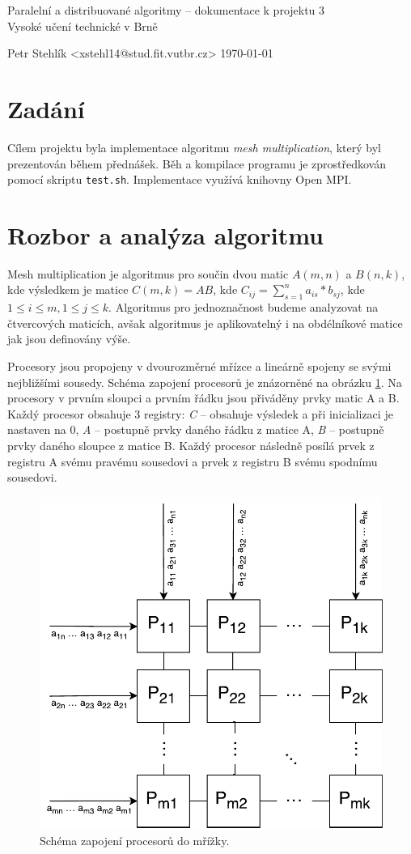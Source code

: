 \documentclass[11pt,a4paper]{article}
\begin{document}
\begin{center}
	\LARGE{Paralelní a distribuované algoritmy -- dokumentace k projektu 3}\\
	\large{Vysoké učení technické v Brně}
	\vspace{0.2cm}

	Petr Stehlík <xstehl14@stud.fit.vutbr.cz>     \today

\end{center}

\section{Zadání}

Cílem projektu byla implementace algoritmu \textit{mesh multiplication}, který byl prezentován během přednášek. Běh a kompilace programu je zprostředkován pomocí skriptu \texttt{test.sh}. Implementace využívá knihovny Open MPI.

\section{Rozbor a analýza algoritmu}

Mesh multiplication je algoritmus pro součin dvou matic $A(m,n)$ a $B(n,k)$, kde výsledkem je matice $C (m,k) = AB$, kde $C_{ij} = \sum\limits_{s=1}^n a_{is} * b_{sj}$, kde $1 \leq i \leq m, 1 \leq j \leq k$. Algoritmus pro jednoznačnost budeme analyzovat na čtvercových maticích, avšak algoritmus je aplikovatelný i na obdélníkové matice jak jsou definovány výše.

Procesory jsou propojeny v dvourozměrné mřízce a lineárně spojeny se svými nejbližšími sousedy. Schéma zapojení procesorů je znázorněné na obrázku \ref{schema}. Na procesory v prvním sloupci a prvním řádku jsou přiváděny prvky matic A a B. Každý procesor obsahuje 3 registry: \textit{C} -- obsahuje výsledek a při inicializaci je nastaven na $0$, \textit{A} -- postupně prvky daného řádku z matice A, \textit{B} -- postupně prvky daného sloupce z matice B. Každý procesor následně posílá prvek z registru A svému pravému sousedovi a prvek z registru B svému spodnímu sousedovi.

\begin{figure}[h]
    \includegraphics[width=0.4\linewidth]{mesh}
    \centering
	\caption{Schéma zapojení procesorů do mřížky.}
    \label{schema}
\end{figure}
\end{document}
